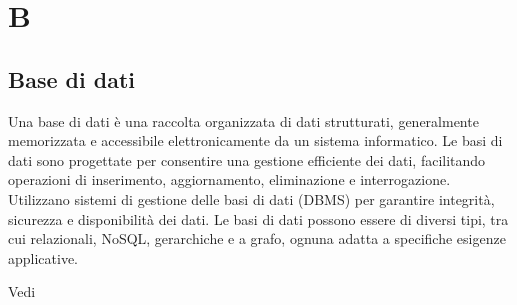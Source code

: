 \section{B}

\vspace{2em}
\subsection*{Base di dati}
Una base di dati è una raccolta organizzata di dati strutturati, generalmente memorizzata e accessibile elettronicamente da un sistema informatico. Le basi di dati sono progettate per consentire una gestione efficiente dei dati, facilitando operazioni di inserimento, aggiornamento, eliminazione e interrogazione. Utilizzano sistemi di gestione delle basi di dati (DBMS) per garantire integrità, sicurezza e disponibilità dei dati. Le basi di dati possono essere di diversi tipi, tra cui relazionali, NoSQL, gerarchiche e a grafo, ognuna adatta a specifiche esigenze applicative.
\par Vedi 
